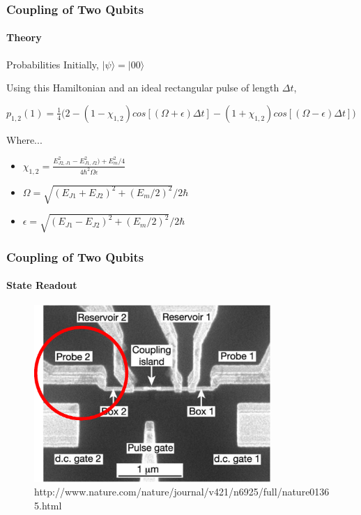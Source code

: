 \documentclass{beamer}
\begin{document}
\begin{frame}
    \frametitle{Coupling of Two Qubits}
    \framesubtitle{Theory}
    \begin{block}{Probabilities}
        \fontsize{8}{18}\selectfont
        Initially, $|\psi\rangle=|00\rangle$

        Using this Hamiltonian and an ideal rectangular pulse of length $\Delta t$,

        $p_{1,2}(1)=\frac{1}{4} \Bigg ( 2-(1-\chi_{1,2})cos[(\Omega+\epsilon)\Delta t]-(1+\chi_{1,2})cos[(\Omega-\epsilon)\Delta t] \Bigg )$

        Where...
        \begin{itemize}
            \item $\chi_{1,2}=\frac{E^2_{J2,J1}-E^2_{J1,J2})+E^2_m/4}{4\hbar^2\Omega\epsilon}$
            \item $\Omega = \sqrt{(E_{J1}+E_{J2})^2+(E_m/2)^2}/2\hbar$
            \item $\epsilon = \sqrt{(E_{J1}-E_{J2})^2+(E_m/2)^2}/2\hbar$
        \end{itemize}
    \end{block}
\end{frame}


\begin{frame}
    \frametitle{Coupling of Two Qubits}
    \framesubtitle{State Readout}
    \begin{figure}[!htb]
        \centering
        \includegraphics[width=0.8\textwidth]{img/two-qubit-sem-probe.eps}
        \caption{http://www.nature.com/nature/journal/v421/n6925/full/nature01365.html}
    \end{figure}
\end{frame}
\end{document}
